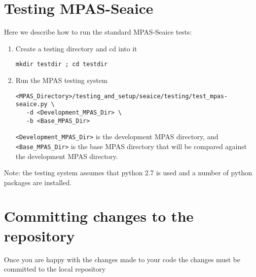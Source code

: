 \documentclass{article}
\begin{document}

\section{Testing MPAS-Seaice}
\label{sec:testing}

Here we describe how to run the standard MPAS-Seaice tests:

\begin{enumerate}

\item Create a testing directory and cd into it

\verb+mkdir testdir ; cd testdir+

\item Run the MPAS testing system

\begin{verbatim}
<MPAS_Directory>/testing_and_setup/seaice/testing/test_mpas-seaice.py \
   -d <Development_MPAS_Dir> \
   -b <Base_MPAS_Dir>
\end{verbatim}

\verb+<Development_MPAS_Dir>+ is the development MPAS directory, and \verb+<Base_MPAS_Dir>+ is the base MPAS directory that will be compared against the development MPAS directory.

\end{enumerate}

Note: the testing system assumes that python 2.7 is used and a number of python packages are installed.


\section{Committing changes to the repository}
\label{sec:committing}

Once you are happy with the changes made to your code the changes must be committed to the local repository
\end{document}
